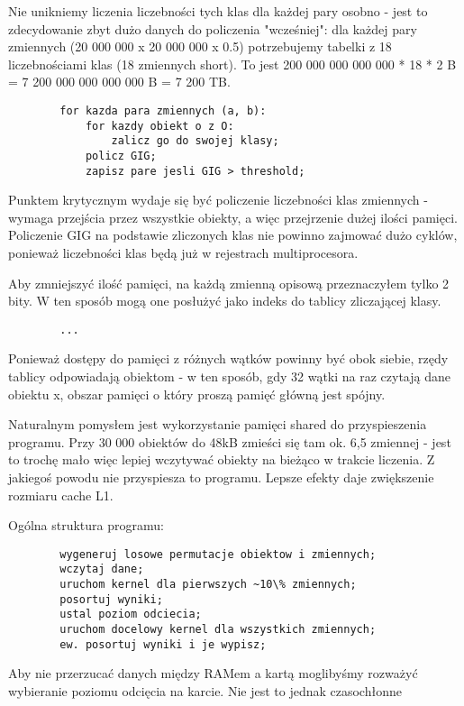 \documentclass[a4paper]{article}
\begin{document}
    Nie unikniemy liczenia liczebności tych klas dla każdej pary osobno - jest to zdecydowanie zbyt dużo danych do policzenia "wcześniej": dla każdej pary zmiennych (20 000 000 x 20 000 000 x 0.5) potrzebujemy tabelki z 18 liczebnościami klas (18 zmiennych short). To jest 200 000 000 000 000 * 18 * 2 B = 7 200 000 000 000 000 B = 7 200 TB.

    \begin{lstlisting}
        for kazda para zmiennych (a, b):
            for kazdy obiekt o z O:
                zalicz go do swojej klasy;
            policz GIG;
            zapisz pare jesli GIG > threshold;
    \end{lstlisting}

    Punktem krytycznym wydaje się być policzenie liczebności klas zmiennych - wymaga przejścia przez wszystkie obiekty, a więc przejrzenie dużej ilości pamięci. Policzenie GIG na podstawie zliczonych klas nie powinno zajmować dużo cyklów, ponieważ liczebności klas będą już w rejestrach multiprocesora.

    Aby zmniejszyć ilość pamięci, na każdą zmienną opisową przeznaczyłem tylko 2 bity. W ten sposób mogą one posłużyć jako indeks do tablicy zliczającej klasy.

    \begin{lstlisting}
        ...
    \end{lstlisting}

    Ponieważ dostępy do pamięci z różnych wątków powinny być obok siebie, rzędy tablicy odpowiadają obiektom - w ten sposób, gdy 32 wątki na raz czytają dane obiektu x, obszar pamięci o który proszą pamięć główną jest spójny.

    Naturalnym pomysłem jest wykorzystanie pamięci shared do przyspieszenia programu. Przy 30 000 obiektów do 48kB zmieści się tam ok. 6,5 zmiennej - jest to trochę mało więc lepiej wczytywać obiekty na bieżąco w trakcie liczenia. Z jakiegoś powodu nie przyspiesza to programu. Lepsze efekty daje zwiększenie rozmiaru cache L1.


    Ogólna struktura programu:
    \begin{lstlisting}
        wygeneruj losowe permutacje obiektow i zmiennych;
        wczytaj dane;
        uruchom kernel dla pierwszych ~10\% zmiennych;
        posortuj wyniki;
        ustal poziom odciecia;
        uruchom docelowy kernel dla wszystkich zmiennych;
        ew. posortuj wyniki i je wypisz;
    \end{lstlisting} 
    Aby nie przerzucać danych między RAMem a kartą moglibyśmy rozważyć wybieranie poziomu odcięcia na karcie. Nie jest to jednak czasochłonne
\end{document}
